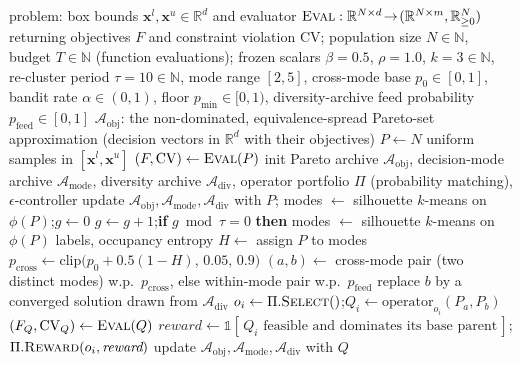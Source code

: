 \begin{algorithm}[t]
\caption{EARS-MMOEA (one run).}
\label{alg:ears}
\begin{algorithmic}[1]
\Require problem: box bounds $\mathbf{x}^l,\mathbf{x}^u\in\mathbb{R}^{d}$ and evaluator
  $\textsc{Eval}:\mathbb{R}^{N\times d}\!\to\!(\mathbb{R}^{N\times m},\mathbb{R}_{\ge 0}^{N})$
  returning objectives $F$ and constraint violation $\mathrm{CV}$; population size $N\in\mathbb{N}$,
  budget $T\in\mathbb{N}$ (function evaluations); frozen scalars $\beta{=}0.5$, $\rho{=}1.0$,
  $k{=}3\in\mathbb{N}$, re-cluster period $\tau{=}10\in\mathbb{N}$, mode range $[2,5]$,
  cross-mode base $p_0\in[0,1]$, bandit rate $\alpha\in(0,1)$, floor $p_{\min}\in[0,1)$,
  diversity-archive feed probability $p_{\mathrm{feed}}\in[0,1]$
\Ensure $\mathcal{A}_{\mathrm{obj}}$: the non-dominated, equivalence-spread Pareto-set
  approximation (decision vectors in $\mathbb{R}^{d}$ with their objectives)
\State $P \gets N$ uniform samples in $[\mathbf{x}^l,\mathbf{x}^u]$ 
\State $(F,\mathrm{CV}) \gets \textsc{Eval}(P)$ 
\State init Pareto archive $\mathcal{A}_{\mathrm{obj}}$, decision-mode archive $\mathcal{A}_{\mathrm{mode}}$,
  diversity archive $\mathcal{A}_{\mathrm{div}}$, operator portfolio $\Pi$ (probability matching),
  $\epsilon$-controller
\State update $\mathcal{A}_{\mathrm{obj}},\mathcal{A}_{\mathrm{mode}},\mathcal{A}_{\mathrm{div}}$ with $P$;\quad
  modes $\gets$ silhouette $k$-means on $\phi(P)$;\quad $g\gets0$
  \State $g\gets g+1$;\quad \textbf{if} $g \bmod \tau = 0$ \textbf{then} modes $\gets$ silhouette $k$-means on $\phi(P)$
  \State labels, occupancy entropy $H \gets$ assign $P$ to modes
  \State $p_{\mathrm{cross}} \gets \mathrm{clip}\!\big(p_0 + 0.5(1-H),\,0.05,\,0.9\big)$
   
    \State $(a,b)\gets$ cross-mode pair (two distinct modes) w.p.\ $p_{\mathrm{cross}}$, else within-mode pair
    \State w.p.\ $p_{\mathrm{feed}}$ replace $b$ by a converged solution drawn from $\mathcal{A}_{\mathrm{div}}$
    \State $o_i \gets \Pi.\textsc{Select}()$;\quad $Q_i \gets \text{operator}_{o_i}(P_a,P_b)$
  \EndFor
  \State $(F_Q,\mathrm{CV}_Q)\gets \textsc{Eval}(Q)$
   
    \State $\textit{reward}\gets \mathbb{1}[\,Q_i\text{ feasible and dominates its base parent}\,]$;\quad
    $\Pi.\textsc{Reward}(o_i,\textit{reward})$
  \EndFor
  \State update $\mathcal{A}_{\mathrm{obj}},\mathcal{A}_{\mathrm{mode}},\mathcal{A}_{\mathrm{div}}$ with $Q$

\end{algorithmic}
\end{algorithm}
